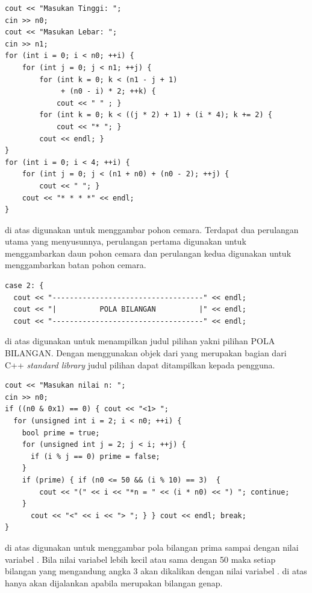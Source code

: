 \documentclass[../main.tex]{subfiles}
\begin{document}
\begin{code}
\begin{verbatim}
cout << "Masukan Tinggi: ";
cin >> n0;
cout << "Masukan Lebar: ";
cin >> n1;
for (int i = 0; i < n0; ++i) {
	for (int j = 0; j < n1; ++j) {
		for (int k = 0; k < (n1 - j + 1)
			 + (n0 - i) * 2; ++k) {
			cout << " "	; }
		for (int k = 0; k < ((j * 2) + 1) + (i * 4); k += 2) {
			cout << "* "; }
		cout << endl; }
}
for (int i = 0; i < 4; ++i) {
	for (int j = 0; j < (n1 + n0) + (n0 - 2); ++j) {
		cout << " "; }
	cout << "* * * *" << endl;
}
\end{verbatim}
\end{code}

{\Script} di atas digunakan untuk menggambar pohon cemara. Terdapat dua perulangan utama yang menyusunnya, perulangan pertama digunakan untuk menggambarkan daun pohon cemara dan perulangan kedua digunakan untuk menggambarkan batan pohon cemara.

\begin{code}
\begin{verbatim}
case 2: {
  cout << "-----------------------------------" << endl;
  cout << "|          POLA BILANGAN          |" << endl;
  cout << "-----------------------------------" << endl;
\end{verbatim}
\end{code}

{\Script} di atas digunakan untuk menampilkan judul pilihan yakni pilihan POLA BILANGAN. Dengan menggunakan objek  dari {\header} {\file}  yang merupakan bagian dari C++ \textit{standard library} judul pilihan dapat ditampilkan kepada pengguna.

\begin{code}
\begin{verbatim}
cout << "Masukan nilai n: ";
cin >> n0;
if ((n0 & 0x1) == 0) { cout << "<1> ";
  for (unsigned int i = 2; i < n0; ++i) {
  	bool prime = true;
  	for (unsigned int j = 2; j < i; ++j) {
  	  if (i % j == 0) prime = false;
    }
  	if (prime) { if (n0 <= 50 && (i % 10) == 3)  {
  	  	cout << "(" << i << "*n = " << (i * n0) << ") "; continue;
    }
  	  cout << "<" << i << "> "; } } cout << endl; break;
}
\end{verbatim}
\end{code}

{\Script} di atas digunakan untuk menggambar pola bilangan prima sampai dengan nilai variabel . Bila nilai variabel  lebih kecil atau sama dengan 50 maka setiap bilangan yang mengandung angka 3 akan dikalikan dengan nilai variabel . {\Script} di atas hanya akan dijalankan apabila  merupakan bilangan genap.
\end{document}
